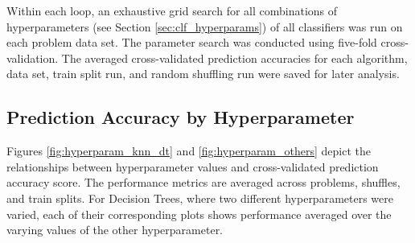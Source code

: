 \documentclass[twoside,11pt]{article}
\begin{document}
		Within each loop, an exhaustive grid search for all combinations of hyperparameters (see Section \ref{sec:clf_hyperparams}) of all classifiers was run on each problem data set. The parameter search was conducted using five-fold cross-validation. The averaged cross-validated prediction accuracies for each algorithm, data set, train split run, and random shuffling run were saved for later analysis.
		
		\subsection{Prediction Accuracy by Hyperparameter}
			Figures \ref{fig:hyperparam_knn_dt} and \ref{fig:hyperparam_others} depict the relationships between hyperparameter values and cross-validated prediction accuracy score. The performance metrics are averaged across problems, shuffles, and train splits. For Decision Trees, where two different hyperparameters were varied, each of their corresponding plots shows performance averaged over the varying values of the other hyperparameter.
			
\end{document}
